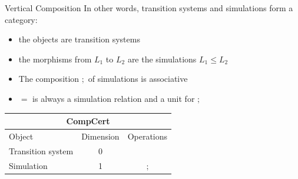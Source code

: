\documentclass[aspectratio=1610,12pt]{beamer}
\begin{document}
\begin{frame}{Vertical Composition \fbox{$;$}} %
  In other words, transition systems and simulations form a category:
  \begin{itemize}
    \item the objects are transition systems
    \item the morphisms from $L_1$ to $L_2$ are the simulations $L_1 \le L_2$
    \item The composition $;$ of simulations is associative
    \item $=$ is always a simulation relation and a unit for $;$
  \end{itemize}

  \pause
  \begin{center}
    \begin{tabular}{lcc}
      \toprule
      \multicolumn{3}{c}{\textbf{CompCert}} \\
      \midrule
      Object & Dimension & Operations \\
      \midrule
      Transition system & 0 \\
      Simulation & 1 & $\mathbin;$ \\
      \bottomrule
    \end{tabular}
  \end{center}
\end{frame}
\end{document}
